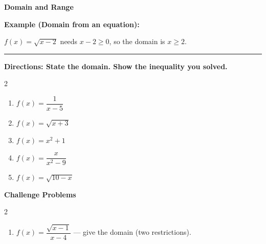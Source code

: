 \documentclass[12pt]{article}
\begin{document}
\vspace{0.35cm}

\begin{center}{\Large \textbf{Domain and Range}}\end{center}\vspace{0.25cm}
\textbf{Example (Domain from an equation):}

$f(x)=\sqrt{x-2}$ needs $x-2\ge 0$, so the domain is $x\ge 2$.

\vspace{0.3cm}\hrule\vspace{0.4cm}
\textbf{Directions: State the domain. Show the inequality you solved.}

\begin{multicols}{2}
\begin{enumerate}[label=\textbf{\arabic*.}, start=1, itemsep=2cm]
  \item $\displaystyle f(x)=\dfrac{1}{x-5}$
  \item $\displaystyle f(x)=\sqrt{x+3}$
  \item $\displaystyle f(x)=x^{2}+1$
  \item $\displaystyle f(x)=\dfrac{x}{x^{2}-9}$
  \item $\displaystyle f(x)=\sqrt{10-x}$
\end{enumerate}
\end{multicols}
\newpage

\begin{center}{\large \textbf{Challenge Problems}}\end{center}\vspace{0.3cm}
\begin{multicols}{2}\begin{enumerate}[label=\textbf{\arabic*.}, start=6, itemsep=2.6cm]
  \item $f(x)=\dfrac{\sqrt{x-1}}{x-4}$ — give the domain (two restrictions).
\end{enumerate}\end{multicols}\newpage
\end{document}
